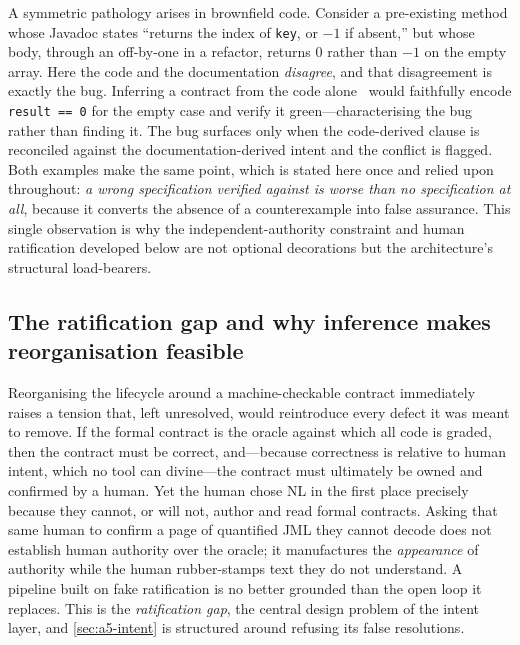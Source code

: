 A symmetric pathology arises in brownfield code. Consider a pre-existing method whose Javadoc states ``returns the index of \texttt{key}, or $-1$ if absent,'' but whose body, through an off-by-one in a refactor, returns $0$ rather than $-1$ on the empty array. Here the code and the documentation \emph{disagree}, and that disagreement is exactly the bug. Inferring a contract from the code alone~\cite{ernst2007daikon,edmonds_article3} would faithfully encode \texttt{result == 0} for the empty case and verify it green---characterising the bug rather than finding it. The bug surfaces only when the code-derived clause is reconciled against the documentation-derived intent and the conflict is flagged. Both examples make the same point, which is stated here once and relied upon throughout: \emph{a wrong specification verified against is worse than no specification at all}, because it converts the absence of a counterexample into false assurance. This single observation is why the independent-authority constraint and human ratification developed below are not optional decorations but the architecture's structural load-bearers.

\subsection{The ratification gap and why inference makes reorganisation feasible}\label{subsec:a5-ratgap}

Reorganising the lifecycle around a machine-checkable contract immediately raises a tension that, left unresolved, would reintroduce every defect it was meant to remove. If the formal contract is the oracle against which all code is graded, then the contract must be correct, and---because correctness is relative to human intent, which no tool can divine---the contract must ultimately be owned and confirmed by a human. Yet the human chose NL in the first place precisely because they cannot, or will not, author and read formal contracts. Asking that same human to confirm a page of quantified JML they cannot decode does not establish human authority over the oracle; it manufactures the \emph{appearance} of authority while the human rubber-stamps text they do not understand. A pipeline built on fake ratification is no better grounded than the open loop it replaces. This is the \emph{ratification gap}, the central design problem of the intent layer, and \cref{sec:a5-intent} is structured around refusing its false resolutions.

